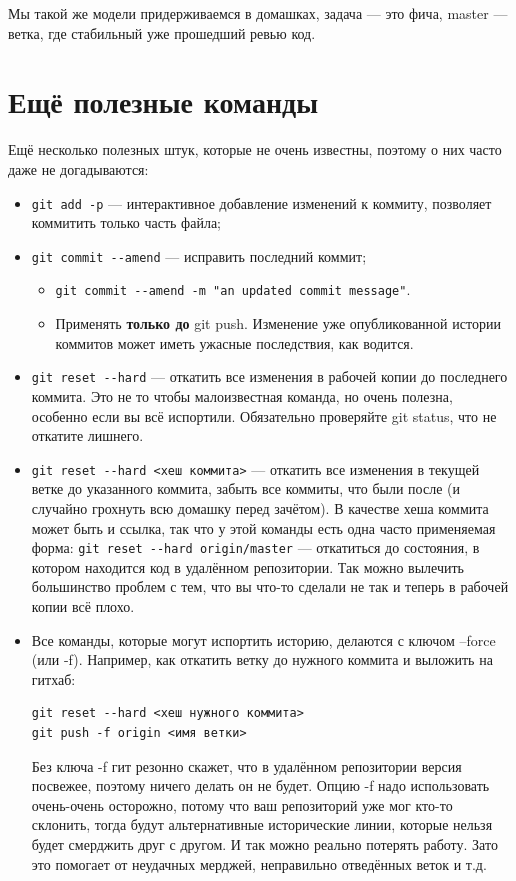 \documentclass[a5paper]{article}
\begin{document}
Мы такой же модели придерживаемся в домашках, задача --- это фича, master --- ветка, где стабильный уже прошедший ревью код.

\section{Ещё полезные команды}

Ещё несколько полезных штук, которые не очень известны, поэтому о них часто даже не догадываются:

\begin{itemize}
	\item \verb|git add -p| --- интерактивное добавление изменений к коммиту, позволяет коммитить только часть файла;
	\item \verb|git commit --amend| --- исправить последний коммит;
	\begin{itemize}
		\item \verb|git commit --amend -m "an updated commit message"|.
		\item Применять \textbf{только до} git push. Изменение уже опубликованной истории коммитов может иметь ужасные последствия, как водится.
	\end{itemize}
	\item \verb|git reset --hard| --- откатить все изменения в рабочей копии до последнего коммита. Это не то чтобы малоизвестная команда, но очень полезна, особенно если вы всё испортили. Обязательно проверяйте git status, что не откатите лишнего.
	\item \verb|git reset --hard <хеш коммита>| --- откатить все изменения в текущей ветке до указанного коммита, забыть все коммиты, что были после (и случайно грохнуть всю домашку перед зачётом). В качестве хеша коммита может быть и ссылка, так что у этой команды есть одна часто применяемая форма: \verb|git reset --hard origin/master| --- откатиться до состояния, в котором находится код в удалённом репозитории. Так можно вылечить большинство проблем с тем, что вы что-то сделали не так и теперь в рабочей копии всё плохо.
	\item Все команды, которые могут испортить историю, делаются с ключом --force (или -f). Например, как откатить ветку до нужного коммита и выложить на гитхаб:
		\begin{verbatim}
git reset --hard <хеш нужного коммита>
git push -f origin <имя ветки>
		\end{verbatim}
		Без ключа -f гит резонно скажет, что в удалённом репозитории версия посвежее, поэтому ничего делать он не будет. Опцию -f надо использовать очень-очень осторожно, потому что ваш репозиторий уже мог кто-то склонить, тогда будут альтернативные исторические линии, которые нельзя будет смерджить друг с другом. И так можно реально потерять работу. Зато это помогает от неудачных мерджей, неправильно отведённых веток и т.д.

\end{itemize}
\end{document}
